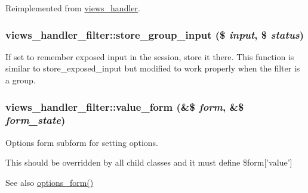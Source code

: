 Reimplemented from \hyperlink{classviews__handler_a7f2453d86d3cb3850826e8c921012f16}{views\_\-handler}.\hypertarget{classviews__handler__filter_a27f90796f2b6083c4f0dbbb92a65dc7c}{
\subsubsection[{store\_\-group\_\-input}]{\setlength{\rightskip}{0pt plus 5cm}views\_\-handler\_\-filter::store\_\-group\_\-input (\$ {\em input}, \/  \$ {\em status})}}
\label{classviews__handler__filter_a27f90796f2b6083c4f0dbbb92a65dc7c}
If set to remember exposed input in the session, store it there. This function is similar to store\_\-exposed\_\-input but modified to work properly when the filter is a group. \hypertarget{classviews__handler__filter_a9168b39edae84b20e01a3fd0d810ba66}{
\subsubsection[{value\_\-form}]{\setlength{\rightskip}{0pt plus 5cm}views\_\-handler\_\-filter::value\_\-form (\&\$ {\em form}, \/  \&\$ {\em form\_\-state})}}
\label{classviews__handler__filter_a9168b39edae84b20e01a3fd0d810ba66}
Options form subform for setting options.

This should be overridden by all child classes and it must define \$form\mbox{[}'value'\mbox{]}

\begin{DoxySeeAlso}{See also}
\hyperlink{classviews__handler__filter_af14c69367162057a32709a6340de0988}{options\_\-form()} 
\end{DoxySeeAlso}


